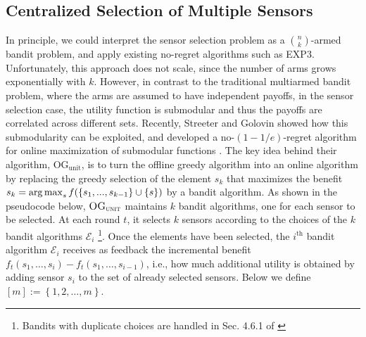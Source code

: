 \documentclass{sig-alternate-dan}
\numberwithin{equation}{section}
\newcommand{\algofont}[1]{\textsc{#1}}
\newcommand{\OGunit}{$\algofont{OG}_{\algofont{unit}}$\xspace}
\newcommand{\EXPthree}{{\algofont{EXP3}}\xspace}
\newcommand{\obj}{\ensuremath{f}} %
\newcommand{\Alg}{\ensuremath{\mathcal{E}}}
\newcommand{\ith}{\ensuremath{i^{\mathrm{th}}}\xspace}
\def \argmax {\mathop{\rm arg\,max}}
\newcommand{\set}[1]{\ensuremath{\left\{#1\right\}}}
\begin{document}
\subsection{Centralized Selection of Multiple Sensors}\label{sec:centralized-multi}
In principle, we could interpret the sensor selection problem as a
$\binom{n}{k}$-armed bandit problem, and apply existing no-regret
algorithms such as \EXPthree. Unfortunately, this approach does not
scale, since the number of arms grows exponentially with $k$.
However, in contrast to the traditional multiarmed bandit problem,
where the arms are assumed to have independent payoffs, in the sensor
selection case, the utility function is submodular and thus the
payoffs are correlated across different sets.  Recently, Streeter and
Golovin showed how this submodularity can be exploited, and developed
a no-$(1-1/e)$-regret algorithm for online maximization of submodular
functions \cite{streeter08}.
%
%
%
%
%
%
%
%
%
%
%
%
%
%
%
%
%
%
%
%
The key idea behind their algorithm, $\text{OG}_{\text{unit}}$, is to
turn the offline greedy algorithm into an online algorithm by
replacing the greedy selection of the element $s_{k}$ that maximizes
the benefit $s_{k}=\argmax_{s} \obj(\{s_{1},...,s_{k-1}\}\cup\{s\})$
by a bandit algorithm. As shown in the pseudocode below, \OGunit
maintains $k$ bandit algorithms, one for each sensor to be selected.
At each round $t$, it selects $k$ sensors according to the choices of
the $k$ bandit algorithms $\Alg_{i}$ \footnote{Bandits with duplicate
choices are handled in Sec. 4.6.1 of \cite{streeter08}}.  Once the
elements have been selected, the $\ith$ bandit algorithm $\Alg_{i}$
receives as feedback the incremental benefit
$\obj_{t}(s_{1},\dots,s_{i})-\obj_{t}(s_{1},\dots,s_{i-1})$, i.e., how
much additional utility is obtained by adding sensor $s_{i}$ to the
set of already selected sensors.  Below we define $[m] := \set{1, 2,
  \ldots, m}$.


%
%
%
%
%
%
%
%
%
%
%
%
%
%
%
%
%
%
\end{document}

